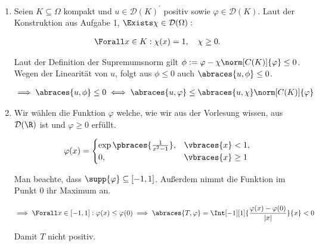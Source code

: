 \begin{solution}

\phantom{}

\begin{enumerate}[label = (\roman*)]

    \item Seien $K \subseteq \Omega$ kompakt und $u \in \mathcal{D}(K)^\prime$ positiv sowie $\varphi \in \mathcal{D}(K)$.
    Laut der Konstruktion aus Aufgabe 1, $\Exists \chi \in \mathcal{D}(\Omega):$

    \begin{align*}
        \Forall x \in K: \chi(x) = 1,
        \quad
        \chi \geq 0.
    \end{align*}
    
    Laut der Definition der Supremumsnorm gilt $\phi := \varphi - \chi \norm[C(K)]{\varphi} \leq 0$.
    Wegen der Linearität von $u$, folgt aus $\phi \leq 0$ auch $\abraces{u, \phi} \leq 0$.

    \begin{align*}
        \implies
        \abraces{u, \phi} \leq 0
        \iff
        \abraces{u, \varphi} \leq \abraces{u, \chi} \norm[C(K)]{\varphi}
	\end{align*}

    \item Wir wählen die Funktion $\varphi$ welche, wie wir aus der Vorlesung wissen, aus $\mathcal{D}(\R)$ ist und $\varphi \geq 0$ erfüllt.

    \begin{align*}
        \varphi(x)
        =
        \begin{cases}
            \exp\pbraces{\frac{1}{x^2 - 1}}, & \vbraces{x} < 1, \\
            0,                               & \vbraces{x} \geq 1
        \end{cases}
	\end{align*}

    Man beachte, dass $\supp{\varphi} \subseteq [-1, 1]$.
    Außerdem nimmt die Funktion im Punkt $0$ ihr Maximum an.

    \begin{align*}
    \implies
    \Forall x \in [-1, 1]:
    \varphi(x) \leq \varphi(0)
    \implies
	\abraces{T, \varphi} = \Int[-1][1]
	{
		\frac{\varphi(x) - \varphi(0)}{|x|}
	}{x} < 0 
	\end{align*}

    Damit $T$ nicht positiv.

\end{enumerate}

\end{solution}


